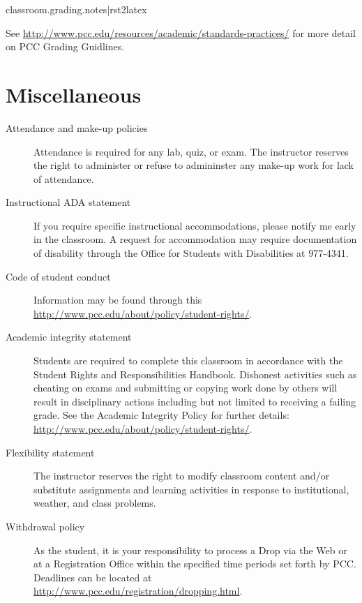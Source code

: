 \documentclass{article}
\begin{document}
{{{{\begin{center}
\end{center}

{{ classroom.grading.notes|rst2latex }}

See \url{http://www.pcc.edu/resources/academic/standards-practices/} for more detail on PCC Grading Guidlines.


\section{Miscellaneous}

\begin{description}
\item[{Attendance and make-up policies}] \leavevmode 
Attendance is required for any lab, quiz, or exam. The instructor reserves the right to administer or refuse to admininster any make-up work for lack of attendance.

\item[{Instructional ADA statement}] \leavevmode 
If you require specific instructional accommodations, please notify me early in the classroom. A request for accommodation may require documentation of disability through the Office for Students with Disabilities at 977-4341.

\item[{Code of student conduct}] \leavevmode 
Information may be found through this \url{http://www.pcc.edu/about/policy/student-rights/}.

\item[{Academic integrity statement}] \leavevmode 
Students are required to complete this classroom in accordance with the Student Rights and Responsibilities Handbook. Dishonest activities such as cheating on exams and submitting or copying work done by others will result in disciplinary actions including but not limited to receiving a failing grade. See the Academic Integrity Policy for further details: \url{http://www.pcc.edu/about/policy/student-rights/}.

\item[{Flexibility statement}] \leavevmode 
The instructor reserves the right to modify classroom content and/or substitute assignments and learning activities in response to institutional, weather, and class problems.

\item[{Withdrawal policy}] \leavevmode 
As the student, it is your responsibility to process a Drop via the Web or at a Registration Office within the specified time periods set forth by PCC. Deadlines can be located at \url{http://www.pcc.edu/registration/dropping.html}.


\end{description}}}}}
\end{document}
